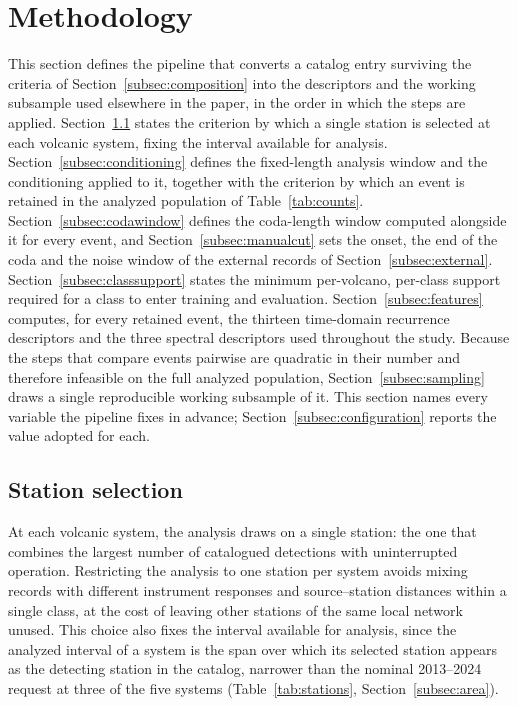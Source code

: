 \documentclass[pdflatex,sn-mathphys-num]{sn-jnl}
\begin{document}
\section{Methodology}\label{sec:methods}

This section defines the pipeline that converts a catalog entry surviving the
criteria of Section~\ref{subsec:composition} into the descriptors and the
working subsample used elsewhere in the paper, in the order in which the steps
are applied. Section~\ref{subsec:stationselection} states the criterion by
which a single station is selected at each volcanic system, fixing the
interval available for analysis. Section~\ref{subsec:conditioning} defines the fixed-length analysis
window and the conditioning applied to it, together with the criterion by
which an event is retained in the analyzed population of
Table~\ref{tab:counts}. Section~\ref{subsec:codawindow} defines the
coda-length window computed alongside it for every event, and
Section~\ref{subsec:manualcut} sets the onset, the end of the coda and the
noise window of the external records of Section~\ref{subsec:external}. Section~\ref{subsec:classsupport} states the minimum
per-volcano, per-class support required for a class to enter training and
evaluation. Section~\ref{subsec:features} computes, for every retained event,
the thirteen time-domain recurrence descriptors and the three spectral
descriptors used throughout the study. Because the steps that compare events
pairwise are quadratic in their number and therefore infeasible on the full
analyzed population, Section~\ref{subsec:sampling} draws a single
reproducible working subsample of it. This section names every variable the
pipeline fixes in advance; Section~\ref{subsec:configuration} reports the
value adopted for each.

\subsection{Station selection}\label{subsec:stationselection}

At each volcanic system, the analysis draws on a single station: the one
that combines the largest number of catalogued detections with
uninterrupted operation. Restricting the analysis to one station per system
avoids mixing records with different instrument responses and
source--station distances within a single class, at the cost of leaving
other stations of the same local network unused. This choice also fixes the
interval available for analysis, since the analyzed interval of a system is
the span over which its selected station appears as the detecting station in
the catalog, narrower than the nominal 2013--2024 request at three of the
five systems (Table~\ref{tab:stations}, Section~\ref{subsec:area}).
\end{document}

